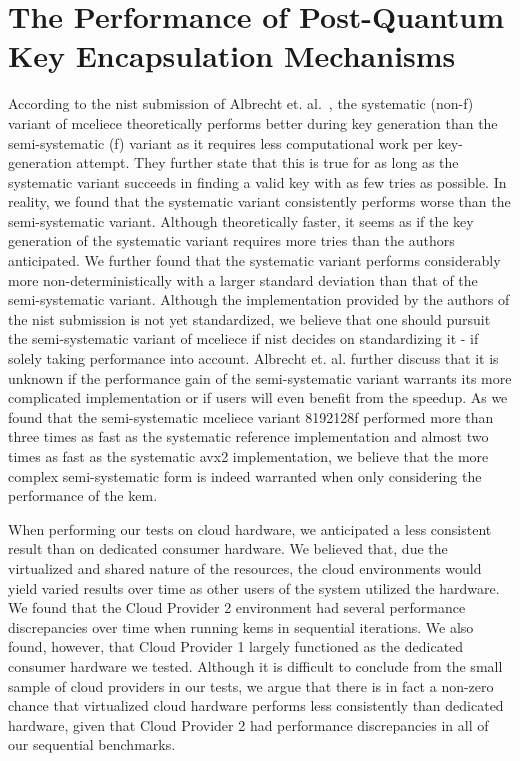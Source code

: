 \section{The Performance of Post-Quantum Key Encapsulation Mechanisms}

According to the \gls{nist} submission of Albrecht et. al.~\cite{mceliece2020}, the systematic (non-f) variant of \gls{mceliece} theoretically performs better during key generation than the semi-systematic (f) variant as it requires less computational work per key-generation attempt. They further state that this is true for as long as the systematic variant succeeds in finding a valid key with as few tries as possible. In reality, we found that the systematic variant consistently performs worse than the semi-systematic variant. Although theoretically faster, it seems as if the key generation of the systematic variant requires more tries than the authors anticipated. We further found that the systematic variant performs considerably more non-deterministically with a larger standard deviation than that of the semi-systematic variant. Although the implementation provided by the authors of the \gls{nist} submission is not yet standardized, we believe that one should pursuit the semi-systematic variant of \gls{mceliece} if \gls{nist} decides on standardizing it - if solely taking performance into account. Albrecht et. al. further discuss that it is unknown if the performance gain of the semi-systematic variant warrants its more complicated implementation or if users will even benefit from the speedup. As we found that the semi-systematic \gls{mceliece} variant 8192128f performed more than three times as fast as the systematic reference implementation and almost two times as fast as the systematic \gls{avx2} implementation, we believe that the more complex semi-systematic form is indeed warranted when only considering the performance of the \gls{kem}.

When performing our tests on cloud hardware, we anticipated a less consistent result than on dedicated consumer hardware. We believed that, due the virtualized and shared nature of the resources, the cloud environments would yield varied results over time as other users of the system utilized the hardware. We found that the Cloud Provider 2 environment had several performance discrepancies over time when running \glspl{kem} in sequential iterations. We also found, however, that Cloud Provider 1 largely functioned as the dedicated consumer hardware we tested. Although it is difficult to conclude from the small sample of cloud providers in our tests, we argue that there is in fact a non-zero chance that virtualized cloud hardware performs less consistently than dedicated hardware, given that Cloud Provider 2 had performance discrepancies in all of our sequential benchmarks. 

